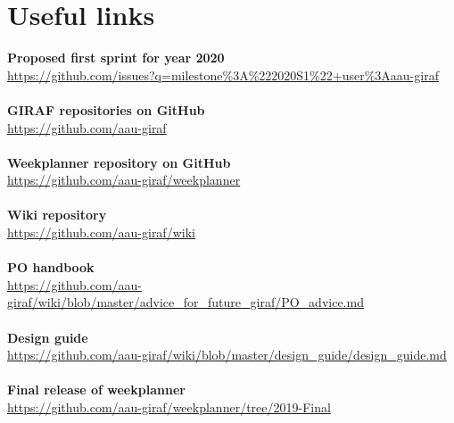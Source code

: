 \newpage
\chapter{Useful links}
\textbf{Proposed first sprint for year 2020} \\
\href{https://github.com/issues?q=milestone%3A%222020S1%22+user%3Aaau-giraf}{https://github.com/issues?q=milestone\%3A\%222020S1\%22+user\%3Aaau-giraf}
\\\\
\textbf{GIRAF repositories on GitHub} \\
\href{https://github.com/aau-giraf}{https://github.com/aau-giraf}
\\\\
\textbf{Weekplanner repository on GitHub} \\
\href{https://github.com/aau-giraf/weekplanner}{https://github.com/aau-giraf/weekplanner}
\\\\
\textbf{Wiki repository} \\
\href{https://github.com/aau-giraf/wiki}{https://github.com/aau-giraf/wiki}
\\\\
\textbf{PO handbook} \\
\href{https://github.com/aau-giraf/wiki/blob/master/advice_for_future_giraf/PO_advice.md}{https://github.com/aau-giraf/wiki/blob/master/advice\_for\_future\_giraf/PO\_advice.md}
\\\\
\textbf{Design guide} \\
\href{https://github.com/aau-giraf/wiki/blob/master/design_guide/design_guide.md}{https://github.com/aau-giraf/wiki/blob/master/design\_guide/design\_guide.md}
\\\\
\textbf{Final release of weekplanner} \\
\href{https://github.com/aau-giraf/weekplanner/tree/2019-Final}{https://github.com/aau-giraf/weekplanner/tree/2019-Final}
